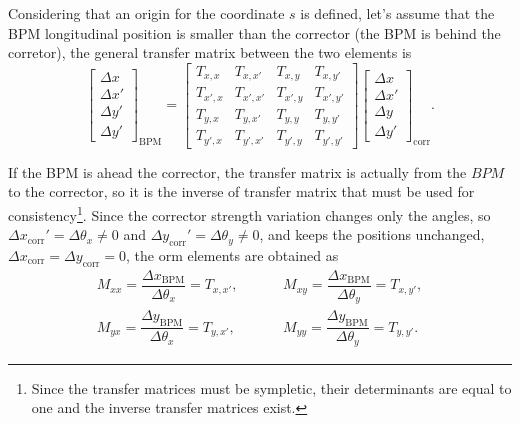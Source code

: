 Considering that an origin for the coordinate $s$ is defined, let's assume that the BPM longitudinal position is smaller than the corrector (the BPM is behind the corretor), the general transfer matrix between the two elements is
\begin{equation}
    \begin{bmatrix}
    \Delta x \\
    \Delta x' \\
    \Delta y' \\
    \Delta y'
    \end{bmatrix}_{\mathrm{BPM}}  =
    \begin{bmatrix}
    T_{x, x} & T_{x, x'} & T_{x, y} & T_{x, y'} \\
    T_{x', x} & T_{x', x'} & T_{x', y} & T_{x', y'} \\
    T_{y, x} & T_{y, x'} & T_{y, y} & T_{y, y'} \\
    T_{y', x} & T_{y', x'} & T_{y', y} & T_{y', y'} 
    \end{bmatrix} 
    \begin{bmatrix}
    \Delta x \\
    \Delta x' \\
    \Delta y \\
    \Delta y'
    \end{bmatrix}_{\mathrm{corr}}.
\end{equation}

If the BPM is ahead the corrector, the transfer matrix is actually from the $BPM$ to the corrector, so it is the inverse of transfer matrix that must be used for consistency\footnote{Since the transfer matrices must be sympletic, their determinants are equal to one and the inverse transfer matrices exist.}. Since the corrector strength variation changes only the angles, so $\Delta x_{\mathrm{corr}}' = \Delta \theta_x \neq 0$ and $\Delta y_{\mathrm{corr}}' = \Delta \theta_y \neq 0$, and keeps the positions unchanged, $\Delta x_{\mathrm{corr}} = \Delta y_{\mathrm{corr}} = 0$, the \gls{orm} elements are obtained as 
\begin{align*}
    M_{xx} = \dfrac{\Delta x_{\mathrm{BPM}}}{\Delta \theta_x} = T_{x, x'}, & \hspace{1cm} M_{xy} = \dfrac{\Delta x_{\mathrm{BPM}}}{\Delta \theta_y} = T_{x, y'}, \\
    M_{yx} = \dfrac{\Delta y_{\mathrm{BPM}}}{\Delta \theta_x} = T_{y, x'}, & \hspace{1cm} M_{yy} = \dfrac{\Delta y_{\mathrm{BPM}}}{\Delta \theta_y} = T_{y, y'}.
\end{align*}

